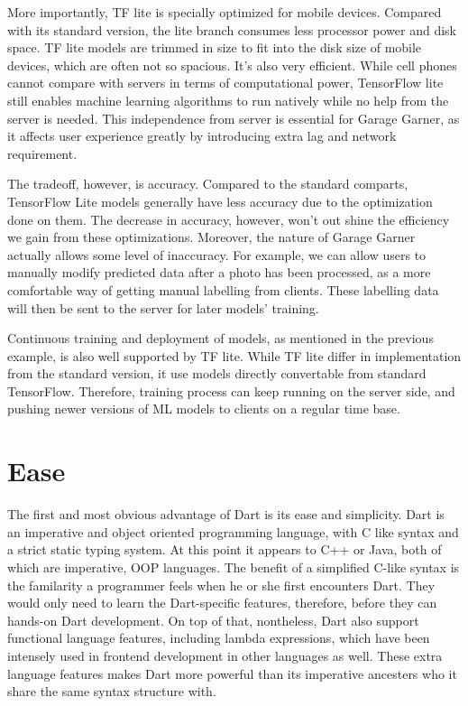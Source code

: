 \documentclass[letterpaper,twocolumn,10pt]{article}
\begin{document}
More importantly, TF lite is specially optimized for mobile devices.
Compared with its standard version, the lite branch consumes less processor power and disk space.
TF lite models are trimmed in size to fit into the disk size of mobile devices, which are often not so spacious.
It's also very efficient. 
While cell phones cannot compare with servers in terms of computational power, TensorFlow lite still enables machine learning algorithms to run natively
while no help from the server is needed.
This independence from server is essential for Garage Garner, as it affects user experience greatly by introducing extra lag and network requirement.

The tradeoff, however, is accuracy.
Compared to the standard comparts, TensorFlow Lite models generally have less accuracy due to the optimization done on them.
The decrease in accuracy, however, won't out shine the efficiency we gain from these optimizations.
Moreover, the nature of Garage Garner actually allows some level of inaccuracy.
For example, we can allow users to manually modify predicted data after a photo has been processed,
as a more comfortable way of getting manual labelling from clients.
These labelling data will then be sent to the server for later models' training.

Continuous training and deployment of models, as mentioned in the previous example, is also well supported by TF lite.
While TF lite differ in implementation from the standard version, it use models directly convertable from standard TensorFlow.
Therefore, training process can keep running on the server side, and pushing newer versions of ML models to clients on a regular time base.

\section{Ease}

The first and most obvious advantage of Dart is its ease and simplicity.
Dart is an imperative and object oriented programming language, with C like syntax and a strict static typing system.
At this point it appears to C++ or Java, both of which are imperative, OOP languages.
The benefit of a simplified C-like syntax is the familarity a programmer feels when he or she first encounters Dart.
They would only need to learn the Dart-specific features, therefore, before they can hands-on Dart development.
On top of that, nontheless, Dart also support functional language features, including lambda expressions, which have been intensely used in frontend
development in other languages as well.
These extra language features makes Dart more powerful than its imperative ancesters who it share the same syntax structure with.
\end{document}
